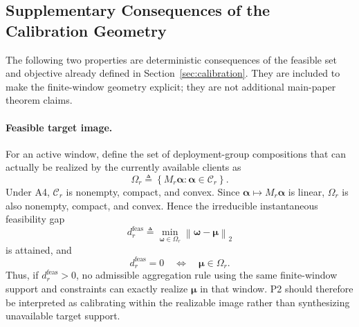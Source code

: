 \documentclass[letterpaper,journal]{IEEEtran}
\begin{document}
\subsection{Supplementary Consequences of the Calibration Geometry}
\label{app:supp_calibration_geometry}

The following two properties are deterministic consequences of the feasible
set and objective already defined in Section~\ref{sec:calibration}.  They are
included to make the finite-window geometry explicit; they are not additional
main-paper theorem claims.

\paragraph{Feasible target image.}
For an active window, define the set of deployment-group compositions that can
actually be realized by the currently available clients as
\begin{equation}
 \Omega_r
 \triangleq
 \left\{
 M_r\boldsymbol\alpha:
 \boldsymbol\alpha\in\mathcal C_r
 \right\}.
 \label{eq:app_feasible_target_image}
\end{equation}
Under A4, $\mathcal C_r$ is nonempty, compact, and convex.  Since
$\boldsymbol\alpha\mapsto M_r\boldsymbol\alpha$ is linear, $\Omega_r$ is also
nonempty, compact, and convex.  Hence the irreducible instantaneous
feasibility gap
\begin{equation}
 d_r^{\mathrm{feas}}
 \triangleq
 \min_{\boldsymbol\omega\in\Omega_r}
 \left\|
 \boldsymbol\omega-\boldsymbol\mu
 \right\|_2
 \label{eq:app_feasibility_gap}
\end{equation}
is attained, and
\begin{equation}
 d_r^{\mathrm{feas}}=0
 \quad\Longleftrightarrow\quad
 \boldsymbol\mu\in\Omega_r.
 \label{eq:app_exact_realizability}
\end{equation}
Thus, if $d_r^{\mathrm{feas}}>0$, no admissible aggregation rule using the same
finite-window support and constraints can exactly realize
$\boldsymbol\mu$ in that window.  P2 should therefore be interpreted as
calibrating within the realizable image rather than synthesizing unavailable
target support.
\end{document}

